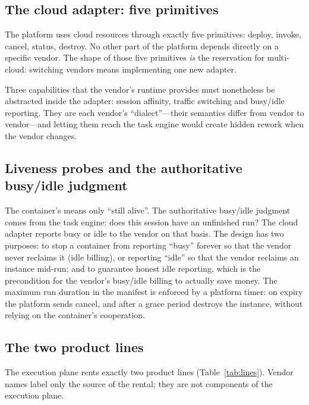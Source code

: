 \subsection{The cloud adapter: five primitives}

The platform uses cloud resources through exactly five primitives: deploy, invoke, cancel, status, destroy. No other part of the platform depends directly on a specific vendor. The shape of those five primitives \emph{is} the reservation for multi-cloud: switching vendors means implementing one new adapter.

Three capabilities that the vendor's runtime provides must nonetheless be abstracted inside the adapter: session affinity, traffic switching and busy/idle reporting. They are each vendor's ``dialect''---their semantics differ from vendor to vendor---and letting them reach the task engine would create hidden rework when the vendor changes.

\subsection{Liveness probes and the authoritative busy/idle judgment}

The container's  means only ``still alive''. The authoritative busy/idle judgment comes from the task engine: does this session have an unfinished run? The cloud adapter reports busy or idle to the vendor on that basis. The design has two purposes: to stop a container from reporting ``busy'' forever so that the vendor never reclaims it (idle billing), or reporting ``idle'' so that the vendor reclaims an instance mid-run; and to guarantee honest idle reporting, which is the precondition for the vendor's busy/idle billing to actually save money. The maximum run duration in the manifest is enforced by a platform timer: on expiry the platform sends cancel, and after a grace period destroys the instance, without relying on the container's cooperation.

\subsection{The two product lines}

The execution plane rents exactly two product lines (Table~\ref{tab:lines}). Vendor names label only the source of the rental; they are not components of the execution plane.

